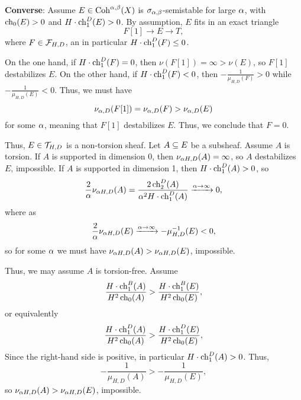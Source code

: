 \documentclass[letterpaper,10pt]{article}
\begin{document}
{\bf Converse}: Assume $E \in \mathrm{Coh}^{\alpha, \beta}(X)$ is $\sigma_{\alpha,\beta}$-semistable for large $\alpha$, with $\operatorname{\mathrm{ch}}_0(E) > 0$ and $H \cdot \operatorname{\mathrm{ch}}_1^D(E) > 0$. By assumption, $E$ fits in an exact triangle
\[ F[1] \to E \to T, \]
where $F \in \mathcal{F}_{H, D}$, an in particular $H \cdot \operatorname{\mathrm{ch}}_1^D(F) \le 0$.

On the one hand, if $H\cdot \operatorname{\mathrm{ch}}_1^D(F) = 0$, then $\nu(F[1]) = \infty > \nu(E)$, so $F[1]$ destabilizes $E$. On the other hand, if $H \cdot \operatorname{\mathrm{ch}}_1^D(F) < 0$, then $-\frac{1}{\mu_{H,D}(F)} > 0$ while $-\frac{1}{\mu_{H,D}(E)} < 0$. Thus, we must have 
\[ \nu_{\alpha,D}(F[1]) = \nu_{\alpha,D}(F) > \nu_{\alpha,D}(E) \] 
for some $\alpha$, meaning that $F[1]$ destabilizes $E$. Thus, we conclude that $F = 0$.

Thus, $E \in \mathcal{T}_{H,D}$ is a non-torsion sheaf. Let $A \subseteq E$ be a subsheaf. Assume $A$ is torsion. If $A$ is supported in dimension 0, then $\nu_{\alpha H, D}(A) = \infty$, so $A$ destabilizes $E$, impossible. If $A$ is supported in dimension 1, then $H\cdot \operatorname{\mathrm{ch}}_1^D(A) > 0$, so
\[ \frac{2}{\alpha}\nu_{\alpha H, D}(A) = \frac{2\operatorname{\mathrm{ch}}_2^D(A)}{\alpha^2 H \cdot \operatorname{\mathrm{ch}}_1^D(A)} \xrightarrow{\alpha \to \infty} 0, \]
where as
\[ \frac{2}{\alpha}\nu_{\alpha H, D}(E) \xrightarrow{\alpha \to \infty} -\mu_{H,D}^{-1}(E) < 0, \]
so for some $\alpha$ we must have $\nu_{\alpha H, D}(A) > \nu_{\alpha H, D}(E)$, impossible.

Thus, we may assume $A$ is torsion-free. Assume
\[ \frac{H \cdot \operatorname{\mathrm{ch}}_1^B(A)}{H^2 \operatorname{\mathrm{ch}}_0(A)} > \frac{H \cdot \operatorname{\mathrm{ch}}_1^B(E)}{H^2 \operatorname{\mathrm{ch}}_0(E)}, \]
or equivalently
\[ \frac{H \cdot \operatorname{\mathrm{ch}}_1^D(A)}{H^2 \operatorname{\mathrm{ch}}_0(A)} > \frac{H \cdot \operatorname{\mathrm{ch}}_1^D(E)}{H^2 \operatorname{\mathrm{ch}}_0(E)}, \]
Since the right-hand side is positive, in particular $H\cdot \operatorname{\mathrm{ch}}_1^D(A) > 0$. Thus,
\[ -\frac{1}{\mu_{H,D}(A)} > -\frac{1}{\mu_{H,D}(E)}, \]
so $\nu_{\alpha H, D}(A) > \nu_{\alpha H, D}(E)$, impossible.
\end{document}
